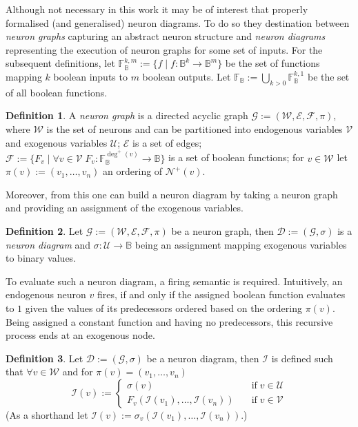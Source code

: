 \documentclass[11pt,a4paper]{book}
\theoremstyle{definition}
\newtheorem{definition}{Definition}[section]
\theoremstyle{definition}
\theoremstyle{definition}
\theoremstyle{remark}
\newcommand{\interi}{\mathcal{I}}
\newcommand{\gtpred}{\mathcal{N}^+}
\newcommand{\gtdegpred}{\deg^+}
\newcommand{\ngraph}{\mathcal{G}}
\newcommand{\ndiagram}{\mathcal{D}}
\newcommand{\cfoos}{\mathcal{F}}
\newcommand{\cvars}{\mathcal{W}}
\newcommand{\cenvars}{\mathcal{V}}
\newcommand{\cexvars}{\mathcal{U}}
\newcommand{\crel}{\mathcal{E}}
\newcommand{\cbinfoos}{\mathbb{F}_{\mathbb{B}}}
\begin{document}
Although not necessary in this work it may be of interest that \cite{erwig2010causal} properly formalised (and generalised) neuron diagrams. To do so they destination between \emph{neuron graphs} capturing an abstract neuron structure and \emph{neuron diagrams} representing the execution of neuron graphs for some set of inputs. For the subsequent definitions, let $\mathbb{F}_{\mathbb{B}}^{k,m}:= \{f \mid f:\mathbb{B}^k\to \mathbb{B}^m\}$ be the set of functions mapping $k$ boolean inputs to $m$ boolean outputs. 
Let $\cbinfoos := \bigcup_{k>0} \mathbb{F}_{\mathbb{B}}^{k,1}$ be the set of all boolean functions. 
\begin{definition}
A \emph{neuron graph} is a directed acyclic graph $\ngraph:=(\cvars, \crel, \cfoos, \pi)$, where $\cvars$ is the set of neurons and can be partitioned into endogenous variables $\cenvars$ and exogenous variables $\cexvars$; $\crel$ is a set of edges; 
 $\cfoos:=\{ F_v \mid \forall v \in \cenvars \; F_v : \cbinfoos^{\gtdegpred(v)} \to \mathbb{B} \}$ is a set of boolean functions;  for $v \in \cvars$ let $\pi(v):= (v_1,\dots, v_n) $ an ordering of $\gtpred(v)$.
\end{definition}
Moreover, from this one can build a neuron diagram by taking a neuron graph and providing an assignment of the exogenous variables.
\begin{definition}
Let $\ngraph:=(\cvars, \crel, \cfoos, \pi)$ be a neuron graph, then $\ndiagram:= (\ngraph,\sigma)$ is a \emph{neuron diagram} and 
$\sigma : \cexvars \to \mathbb{B}$ being an assignment mapping exogenous variables to binary values.
\end{definition}
To evaluate such a neuron diagram, a firing semantic is required. Intuitively, an endogenous neuron $v$ fires, if and only if the assigned boolean function evaluates to $1$ given the values of its predecessors ordered based on the ordering $\pi(v)$. Being assigned a constant function and having no predecessors, this recursive process ends at an exogenous node.
\begin{definition}
Let $\ndiagram:=(\ngraph,\sigma) $ be a neuron diagram, then $\interi$ is defined such that $\forall v \in \cvars$ and for $\pi(v)=(v_1, \dots, v_n)$
\begin{equation*}
\interi(v):= 
\begin{cases}
\sigma(v) & \quad \text{if} \; v \in \cexvars \\
F_v(\mathcal{I}(v_1), \dots , \mathcal{I}(v_n)) & \quad \text{if} \; v \in \cenvars
\end{cases}
\end{equation*}
(As a shorthand let $\interi(v):= \sigma_v(\mathcal{I}(v_1), \dots , \mathcal{I}(v_n))$.)
\end{definition}
\end{document}
